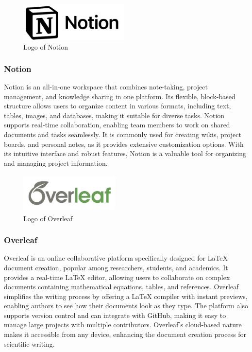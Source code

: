 \documentclass[conference]{IEEEtran}
\begin{document}
        \begin{figure}[htbp]
            \centerline{\includegraphics[width=5.5cm, height=2cm]{Images/logo/notion.png}}
            \caption{Logo of Notion}
            \label{fig}
        \end{figure}
        \subsubsection{Notion}
            Notion is an all-in-one workspace that combines note-taking, project management, and knowledge sharing in one platform. Its flexible, block-based structure allows users to organize content in various formats, including text, tables, images, and databases, making it suitable for diverse tasks. Notion supports real-time collaboration, enabling team members to work on shared documents and tasks seamlessly. It is commonly used for creating wikis, project boards, and personal notes, as it provides extensive customization options. With its intuitive interface and robust features, Notion is a valuable tool for organizing and managing project information.


        \begin{figure}[htbp]
            \centerline{\includegraphics[width=5cm, height=2cm]{Images/logo/overleaf.png}}
            \caption{Logo of Overleaf}
            \label{fig}
        \end{figure}
        \subsubsection{Overleaf}
            Overleaf is an online collaborative platform specifically designed for LaTeX document creation, popular among researchers, students, and academics. It provides a real-time LaTeX editor, allowing users to collaborate on complex documents containing mathematical equations, tables, and references. Overleaf simplifies the writing process by offering a LaTeX compiler with instant previews, enabling authors to see how their documents look as they type. The platform also supports version control and can integrate with GitHub, making it easy to manage large projects with multiple contributors. Overleaf’s cloud-based nature makes it accessible from any device, enhancing the document creation process for scientific writing.
\end{document}
